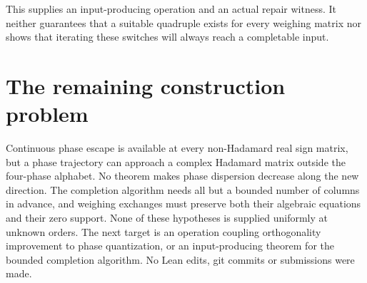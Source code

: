 \documentclass[11pt]{article}
\begin{document}
This supplies an input-producing operation and an actual repair
witness. It neither guarantees that a suitable quadruple exists
for every weighing matrix nor shows that iterating these switches
will always reach a completable input.

\section{The remaining construction problem}
Continuous phase escape is available at every non-Hadamard real sign
matrix, but a phase trajectory can approach a complex Hadamard matrix
outside the four-phase alphabet. No theorem makes phase dispersion
decrease along the new direction. The completion algorithm needs all
but a bounded number of columns in advance, and weighing exchanges
must preserve both their algebraic equations and their zero support.
None of these hypotheses is supplied uniformly at unknown orders.
The next target is an operation coupling orthogonality improvement to
phase quantization, or an input-producing theorem for the bounded
completion algorithm. No Lean edits, git commits or submissions were made.
\end{document}
